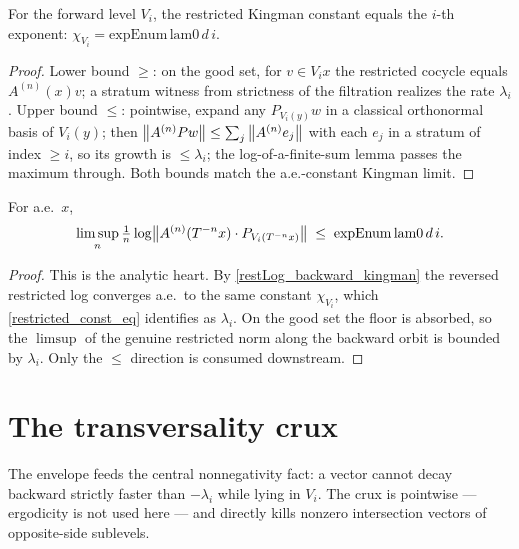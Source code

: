 \begin{proposition}\label{restricted_const_eq}
  \leanok
  For the forward level \(V_i\), the restricted Kingman constant equals the \(i\)-th exponent: \(\chi_{V_i} = \mathrm{expEnum}\,\mathrm{lam0}\,d\,i\).
\end{proposition}
\begin{proof}\leanok
  Lower bound \(\ge\): on the good set, for \(v \in V_i x\) the restricted cocycle equals \(A^{(n)}(x)v\); a stratum witness from strictness of the filtration realizes the rate \(\lambda_i\). Upper bound \(\le\): pointwise, expand any \(P_{V_i(y)}w\) in a classical orthonormal basis of \(V_i(y)\); then \(\left\lVert A^{(n)}P w \right\rVert \le \sum_j \left\lVert A^{(n)}e_j \right\rVert\) with each \(e_j\) in a stratum of index \(\ge i\), so its growth is \(\le \lambda_i\); the log-of-a-finite-sum lemma passes the maximum through. Both bounds match the a.e.-constant Kingman limit.
\end{proof}

\begin{proposition}\label{ae_limsup_restricted_backward_le}
  \leanok
  For a.e.\ \(x\),
  \[
    \limsup_{n} \tfrac{1}{n}\log\bigl\lVert A^{(n)}(T^{-n}x)\cdot P_{V_i(T^{-n}x)} \bigr\rVert \;\le\; \mathrm{expEnum}\,\mathrm{lam0}\,d\,i.
  \]
\end{proposition}
\begin{proof}\leanok
  This is the analytic heart. By \cref{restLog_backward_kingman} the reversed restricted log converges a.e.\ to the same constant \(\chi_{V_i}\), which \cref{restricted_const_eq} identifies as \(\lambda_i\). On the good set the floor is absorbed, so the \(\limsup\) of the genuine restricted norm along the backward orbit is bounded by \(\lambda_i\). Only the \(\le\) direction is consumed downstream.
\end{proof}

\section{The transversality crux}

The envelope feeds the central nonnegativity fact: a vector cannot decay backward strictly faster than \(-\lambda_i\) while lying in \(V_i\). The crux is pointwise — ergodicity is not used here — and directly kills nonzero intersection vectors of opposite-side sublevels.

